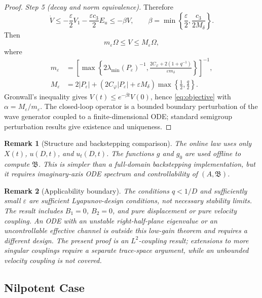\documentclass[journal]{IEEEtran}
\newtheorem{remark}{Remark}
\newcommand{\eps}{\varepsilon}
\newcommand{\Bcal}{\mathfrak B}
\newcommand{\abs}[1]{\left|#1\right|}
\begin{document}
\begin{proof}
\emph{Step 5 (decay and norm equivalence).} Therefore
\begin{equation}
 \dot V\leq-\frac\eps2V_1-\frac{\eps c_3}{2}E_u
 \leq-\beta V,\qquad
 \beta=\min\left\{\frac\eps2,\frac{c_3}{2M_\delta}\right\}. \label{eq:V_decay_general}
\end{equation}
Then
\begin{equation}
 m_\eps\Omega\leq V\leq M_\eps\Omega,
\end{equation}
where
\begin{align}
 m_\eps&=\left[
 \max\left\{2\lambda_{\min}(P_\eps)^{-1},
 \frac{2C_\varphi+2(1+q^{-1})}{\eps m_\delta}
 \right\}\right]^{-1},\\
 M_\eps&=2\abs{P_\eps}
 +\left(2C_\varphi\abs{P_\eps}+\eps M_\delta\right)
 \max\left\{\frac12,\frac q2\right\}.
 \label{eq:V_Omega_constants}
\end{align}
Gronwall's inequality gives \(V(t)\leq e^{-\beta t}V(0)\), hence \eqref{eq:objective} with \(\alpha=M_\eps/m_\eps\). The closed-loop operator is a bounded boundary perturbation of the wave generator coupled to a finite-dimensional ODE; standard semigroup perturbation results give existence and uniqueness.
\end{proof}

\begin{remark}[Structure and backstepping comparison]\label{rem:backstepping}
The online law uses only \(X(t)\), \(u(D,t)\), and \(u_t(D,t)\). The functions \(g\) and \(g_0\) are used offline to compute \(\Bcal\). This is simpler than a full-domain backstepping implementation, but it requires imaginary-axis ODE spectrum and controllability of \((A,\Bcal)\).
\end{remark}

\begin{remark}[Applicability boundary]\label{rem:boundary}
The conditions \(q<1/D\) and sufficiently small \(\eps\) are sufficient Lyapunov-design conditions, not necessary stability limits. The result includes \(B_1=0\), \(B_2=0\), and pure displacement or pure velocity coupling. An ODE with an unstable right-half-plane eigenvalue or an uncontrollable effective channel is outside this low-gain theorem and requires a different design. The present proof is an \(L^2\)-coupling result; extensions to more singular couplings require a separate trace-space argument, while an unbounded velocity coupling is not covered.
\end{remark}

\subsection{Nilpotent Case}
\end{document}
